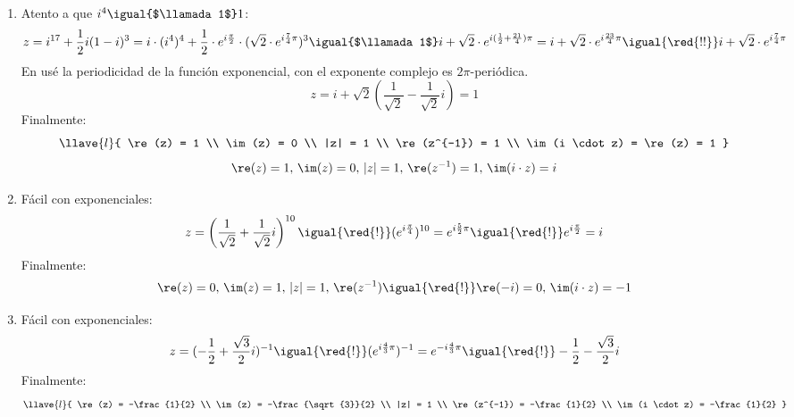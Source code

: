 \begin{enumerate}[label=\roman*)]
  \item Atento a que $i^4 \igual{$\llamada1$} 1$:
        $$
          z = i^{17} + \frac{1}{2} i (1 - i)^3
          =
          i \cdot (i^4)^4 + \frac{1}{2} \cdot e^{i \frac{\pi}{2}} \cdot ( \sqrt{2} \cdot e^{i \frac{7}{4}\pi})^3
          \igual{$\llamada1$}
          i + \sqrt{2} \cdot e^{i ( \frac{1}{2} + \frac{21}{4}) \pi}
          =
          i + \sqrt{2} \cdot e^{i\frac{23}{4} \pi}
          \igual{\red{!!}}
          i + \sqrt{2} \cdot e^{i\frac{7}{4} \pi}
        $$
        En \red{!!} usé la periodicidad de la función exponencial, con el exponente complejo es $2\pi$-periódica.
        $$
          z = i + \sqrt{2}(\frac{1}{\sqrt{2}} - \frac{1}{\sqrt{2}}i) = 1
        $$
        Finalmente:
        $$
          \llave{l}{
            \re(z) = 1      \\
            \im(z) = 0      \\
            |z| = 1         \\
            \re(z^{-1}) = 1 \\
            \im(i \cdot z) = \re(z) = 1
          }
        $$
        $$
          \re(z) = 1 ,\,
          \im(z) = 0 ,\,
          |z| = 1 ,\,
          \re(z^{-1}) = 1,\,
          \im(i \cdot z) = i
        $$

  \item Fácil con exponenciales:
        $$
          z
          =
          \left(\frac{1}{\sqrt{2}} + \frac{1}{\sqrt{2}}i\right)^{10}
          \igual{\red{!}}
          (e^{i \frac{\pi}{4}})^{10}
          =
          e^{i\frac{5}{2}\pi}
          \igual{\red{!}}
          e^{i\frac{\pi}{2}}
          =
          i
        $$
        Finalmente:
        $$
          \re(z) = 0 ,\,
          \im(z) = 1 ,\,
          |z| = 1 ,\,
          \re(z^{-1}) \igual{\red{!}} \re(-i) = 0,\,
          \im(i \cdot z) = -1
        $$

  \item Fácil con exponenciales:
        $$
          z
          =(-\frac{1}{2} + \frac{\sqrt{3}}{2}i)^{-1}
          \igual{\red{!}}
          (e^{i \frac{4}{3}\pi})^{-1}
          =
          e^{-i\frac{4}{3}\pi}
          \igual{\red{!}}
          -\frac{1}{2} - \frac{\sqrt{3}}{2}i
        $$
        Finalmente:
        $$
          \llave{l}{
            \re(z) = -\frac{1}{2}                       \\
            \im(z) = -\frac{\sqrt{3}}{2} \\
            |z| = 1                                     \\
            \re(z^{-1}) = -\frac{1}{2}                  \\
            \im(i \cdot z) = -\frac{1}{2}
          }
        $$
\end{enumerate}

\begin{aportes}
  \item {}
\end{aportes}
